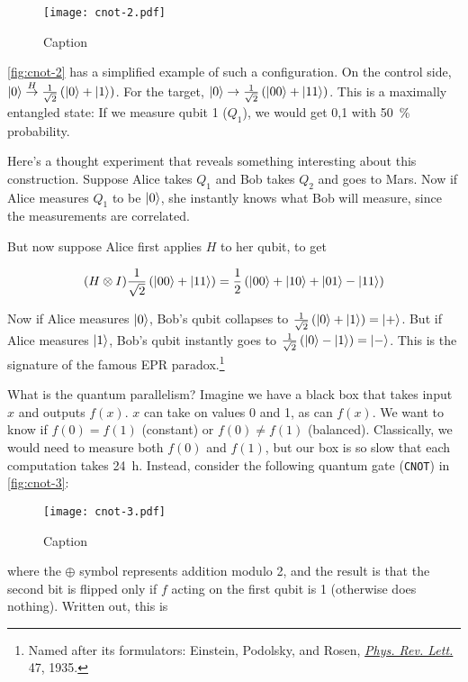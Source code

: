 \documentclass[12pt, english]{book}
\begin{document}
\begin{figure}[!ht]
	\centering
	\texttt{[image: cnot-2.pdf]}
	\caption{Caption}
	\label{fig:cnot-2}
\end{figure}

\autoref{fig:cnot-2} has a simplified example of such a configuration.
On the control side, $\ket{0} \stackrel{H}{\rightarrow} \frac{1}{\sqrt{2}} \left( \ket{0} + \ket{1} \right)$.
For the target, $\ket{0} \rightarrow \frac{1}{\sqrt{2}} \left( \ket{00} + \ket{11} \right)$.
This is a maximally entangled state: If we measure qubit 1 ($Q_1$), we would get 0,1 with \SI{50}{\percent} probability.

Here's a thought experiment that reveals something interesting about this construction.
Suppose Alice takes $Q_1$ and Bob takes $Q_2$ and goes to Mars.
Now if Alice measures $Q_1$ to be $\ket{0}$, she instantly knows what Bob will measure, since the measurements are correlated.

But now suppose Alice first applies $H$ to her qubit, to get

\[ (H \otimes I) \frac{1}{\sqrt{2}} \left( \ket{00} + \ket{11} \right) = \frac{1}{2} \left( \ket{00} + \ket{10} + \ket{01} - \ket{11} \right) \]

Now if Alice measures $\ket{0}$, Bob's qubit collapses to $\frac{1}{\sqrt{2}} \left( \ket{0} + \ket{1} \right) = \ket{+}$.
But if Alice measures $\ket{1}$, Bob's qubit instantly goes to $\frac{1}{\sqrt{2}} \left( \ket{0} - \ket{1} \right) = \ket{-}$.
This is the signature of the famous EPR paradox.\footnote{Named after its formulators: Einstein, Podolsky, and Rosen, \href{https://link.aps.org/doi/10.1103/PhysRev.47.777}{\emph{Phys. Rev. Lett.}} 47, 1935.}

What is the quantum parallelism? 
Imagine we have a black box that takes input $x$ and outputs $f(x)$.
$x$ can take on values 0 and 1, as can $f(x)$.
We want to know if $f(0) = f(1)$ (constant) or $f(0) \neq f(1)$ (balanced).
Classically, we would need to measure both $f(0)$ and $f(1)$, but our box is so slow that each computation takes \SI{24}{\hour}. 
Instead, consider the following quantum gate (\texttt{CNOT}) in \autoref{fig:cnot-3}:

\begin{figure}[!ht]
	\centering
	\texttt{[image: cnot-3.pdf]}
	\caption{Caption}
	\label{fig:cnot-3}
\end{figure}

where the $\oplus$ symbol represents addition modulo 2, and the result is that the second bit is flipped only if $f$ acting on the first qubit is 1 (otherwise does nothing).
Written out, this is 
\end{document}
